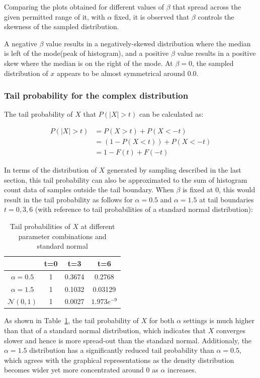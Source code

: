 \documentclass[11pt, twocolumn]{article}
\begin{document}
Comparing the plots obtained for different values of $\beta$ that spread across the given permitted range of it, with $\alpha$ fixed, it is observed that $\beta$ controls the skewness of the sampled distribution. 

A negative $\beta$ value results in a negatively-skewed distribution where the median is left of the mode(peak of histogram), and a positive $\beta$ value results in a positive skew where the median is on the right of the mode. At $\beta=0$, the sampled distribution of $x$ appears to be almost symmetrical around 0.0.

\subsubsection{Tail probability for the complex distribution}
The tail probability of $X$ that $P(|X|>t)$ can be calculated as:

\begin{align*}
    P(|X|>t) &= P(X>t) + P(X<-t) \\
             &= (1-P(X<t)) + P(X<-t) \\
             &= 1-F(t)+F(-t)
\end{align*}

In terms of the distribution of $X$ generated by sampling described in the last section, this tail probability can also be approximated to the sum of histogram count data of samples outside the tail boundary.
When $\beta$ is fixed at 0, this would result in the tail probability as follows for $\alpha=0.5$ and $\alpha=1.5$ at tail boundaries $t=0, 3, 6$ (with reference to tail probabilities of a standard normal distribution):

\begin{table}[h!]
    \centering
    \begin{tabular}{|c|c|c|c|}
        \hline
        & t=0 & t=3 & t=6  \\ 
        \hline
        $\alpha=0.5$ & 1 & 0.3674 & 0.2768 \\ 
        $\alpha=1.5$ & 1 & 0.1032 & 0.03129 \\ 
        $\mathcal{N}(0,1)$ & 1 & 0.0027 & $1.973e^{-9}$ \\
        \hline
    \end{tabular}
    \caption{Tail probabilities of $X$ at different parameter combinations and standard normal}
    \label{table:q4_2}
\end{table}

As shown in Table~\ref{table:q4_2}, the tail probability of $X$ for both $\alpha$ settings is much higher than that of a standard normal distribution, which indicates that $X$ converges slower and hence is more spread-out than the standard normal. 
Additionaly, the $\alpha=1.5$ distribution has a significantly reduced tail probability than $\alpha=0.5$, which agrees with the graphical representations as the density distribution becomes wider yet more concentrated around 0 as $\alpha$ increases.
\end{document}
